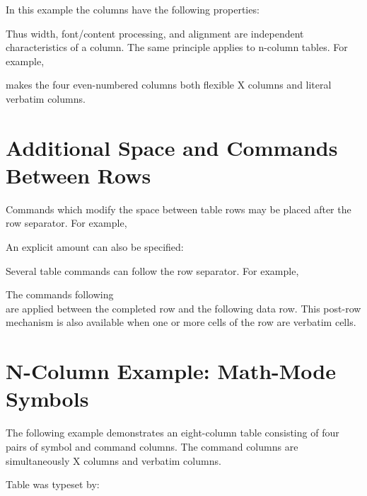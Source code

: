 \documentclass[
11pt,
a4paper,
oneside
]{scrbook}
\begin{document}



In this example the columns have the following properties:
\begin{center}
\end{center}
Thus width, font/content processing, and alignment are independent
characteristics of a column.
The same principle applies to n-column tables. For example,




makes the four even-numbered columns both flexible X columns and literal
verbatim columns.

\section{Additional Space and Commands Between Rows}

Commands which modify the space between table rows may be placed after the
row separator.
For example,




An explicit amount can also be specified:




Several table commands can follow the row separator. For example,




The commands following \texttt{\string\\} are applied between the completed
row and the following data row.
This post-row mechanism is also available when one or more cells of the row
are verbatim cells.

\section{N-Column Example: Math-Mode Symbols}

The following example demonstrates an eight-column table consisting of four
pairs of symbol and command columns. The command columns are simultaneously
X columns and verbatim columns.

\noindent Table  was typeset by:
\end{document}
